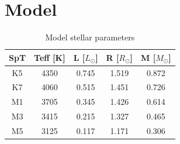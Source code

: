 \documentclass[twocolumn,linenumbers]{aastex631}
\begin{document}
\section{Model} \label{Models}


\begin{table}[]
\centering
\caption{Model stellar parameters}
\begin{tabular}{ccccc}
\hline
SpT & Teff {[}K{]} & L {[}$L_{\odot}${]} & R {[}$R_{\odot}${]} & M {[}$M_{\odot}${]} \\ \hline
K5  & 4350         & 0.745               & 1.519               & 0.872               \\
K7  & 4060         & 0.515               & 1.451               & 0.726               \\
M1  & 3705         & 0.345               & 1.426               & 0.614               \\
M3  & 3415         & 0.215               & 1.327               & 0.465               \\
M5  & 3125         & 0.117               & 1.171               & 0.306               \\ \hline
\end{tabular}
\label{table:parametros_modelos}
\end{table}
\end{document}
